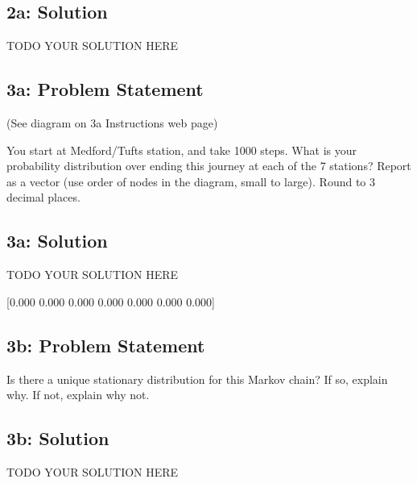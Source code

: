 \documentclass[10pt]{article}
\newcommand{\officialdirections}[1]{{\color{purple} #1}}
\begin{document}
\subsection{2a: Solution}
TODO YOUR SOLUTION HERE



\officialdirections{
\subsection*{3a: Problem Statement}
(See diagram on 3a Instructions web page)

You start at Medford/Tufts station, and take 1000 steps. What is your probability distribution over ending this journey at each of the 7 stations? Report as a vector (use order of nodes in the diagram, small to large). Round to 3 decimal places.
}

\subsection{3a: Solution}
TODO YOUR SOLUTION HERE

[0.000 0.000 0.000 0.000 0.000 0.000 0.000]

\officialdirections{
\subsection*{3b: Problem Statement}
Is there a unique stationary distribution for this Markov chain? If so, explain why. If not, explain why not.
}


\subsection{3b: Solution}
TODO YOUR SOLUTION HERE
\end{document}
